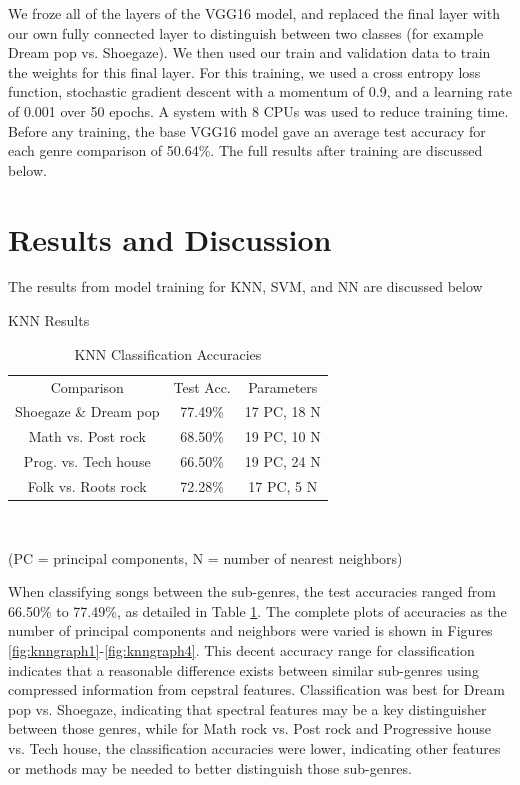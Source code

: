 \documentclass[letterpaper, 12 pt, conference]{ieeeconf}  %
\begin{document}
We froze all of the layers of the VGG16 model, and replaced the final layer with our own fully connected layer to distinguish between two classes (for example Dream pop vs. Shoegaze). We then used our train and validation data to train the weights for this final layer. For this training, we used a cross entropy loss function, stochastic gradient descent with a momentum of 0.9, and a learning rate of 0.001 over 50 epochs. A system with 8 CPUs was used to reduce training time. Before any training, the base VGG16 model gave an average test accuracy for each genre comparison of 50.64\%. The full results after training are discussed below.




\section{Results and Discussion}

The results from model training for KNN, SVM, and NN are discussed below
\newline \,\,

\par KNN Results

\begin{table}[!hb]
    \begin{center}
    \caption{KNN Classification Accuracies}{\label{tab:knn_acc}}
    \begin{tabular}{ |c|c|c| }
      Comparison & Test Acc. & Parameters \\ 
      Shoegaze \& Dream pop & 77.49\% & 17 PC, 18 N\\
      Math vs. Post rock & 68.50\% & 19 PC, 10 N\\
      Prog. vs. Tech house & 66.50\% & 19 PC, 24 N\\
      Folk vs. Roots rock & 72.28\% & 17 PC, 5 N\\
     
    \end{tabular}\\
    \end{center}
    (PC = principal components, N = number of nearest neighbors)
\end{table}

\par When classifying songs between the sub-genres, the test accuracies ranged from 66.50\% to 77.49\%, as detailed in Table \ref{tab:knn_acc}. The complete plots of accuracies as the number of principal components and neighbors were varied is shown in Figures \ref{fig:knngraph1}-\ref{fig:knngraph4}. 
This decent accuracy range for classification indicates that a reasonable difference exists between similar sub-genres using compressed information from cepstral features. Classification was best for Dream pop vs. Shoegaze, indicating that spectral features may be a key distinguisher between those genres, while for Math rock vs. Post rock and Progressive house vs. Tech house, the classification accuracies were lower, indicating other features or methods may be needed to better distinguish those sub-genres. \newline
\end{document}
